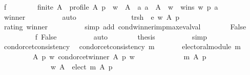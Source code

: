 \begin{isabellebody}
\ f{}{\isacharcolon}{\kern0pt}\isanewline
\ \ \ \ \ \ \ \ {\isachardoublequoteopen}finite\ A\ {\isasymand}\ profile\ A\ p\ {\isasymand}\ w\ {\isasymin}\ A\ {\isasymand}\ {\isacharparenleft}{\kern0pt}{\isasymforall}a{\isachardot}{\kern0pt}\ a\ {\isasymnotin}\ A\ {\isacharminus}{\kern0pt}\ {\isacharbraceleft}{\kern0pt}w{\isacharbraceright}{\kern0pt}\ {\isasymor}\ wins\ w\ p\ a{\isacharparenright}{\kern0pt}{\isachardoublequoteclose}\isanewline
\ \ \ \ \ \ \ \ \isamarkupfalse%
\ winner\isanewline
\ \ \ \ \ \ \ \ \isamarkupfalse%
\ auto\isanewline
\ \ \ \ \ \ \isamarkupfalse%
\isanewline
\ \ \ \ \ \ \ \ {\isachardoublequoteopen}{\isacharquery}{\kern0pt}trsh\ {\isacharequal}{\kern0pt}\ e\ w\ A\ p{\isachardoublequoteclose}\isanewline
\ \ \ \ \ \ \ \ \isamarkupfalse%
\ rating\ winner\isanewline
\ \ \ \ \ \ \ \ \isamarkupfalse%
\ {\isacharparenleft}{\kern0pt}simp\ add{\isacharcolon}{\kern0pt}\ cond{\isacharunderscore}{\kern0pt}winner{\isacharunderscore}{\kern0pt}imp{\isacharunderscore}{\kern0pt}max{\isacharunderscore}{\kern0pt}eval{\isacharunderscore}{\kern0pt}val{\isacharparenright}{\kern0pt}\isanewline
\ \ \ \ \ \ \isamarkupfalse%
\ False\isanewline
\ \ \ \ \ \ \ \ \isamarkupfalse%
\ f{}\ False\isanewline
\ \ \ \ \ \ \ \ \isamarkupfalse%
\ auto\isanewline
\ \ \ \ \ \ \isamarkupfalse%
\ {\isacharquery}{\kern0pt}thesis\isanewline
\ \ \ \ \ \ \ \ \isamarkupfalse%
\ simp\isanewline
\ \ \ \ \isamarkupfalse%
\isanewline
\ \ \isamarkupfalse%
\isanewline
{}\isamarkupfalse%
%
\endisatagproof
{\isafoldproof}%
%
\isadelimproof
\isanewline
%
\endisadelimproof
\isanewline
{}\isamarkupfalse%
\ condorcet{\isacharunderscore}{\kern0pt}consistency{}{\isacharcolon}{\kern0pt}\isanewline
\ \ {\isachardoublequoteopen}condorcet{\isacharunderscore}{\kern0pt}consistency\ m\ {\isasymlongleftrightarrow}\isanewline
\ \ \ \ \ \ electoral{\isacharunderscore}{\kern0pt}module\ m\ {\isasymand}\isanewline
\ \ \ \ \ \ \ \ {\isacharparenleft}{\kern0pt}{\isasymforall}\ A\ p\ w{\isachardot}{\kern0pt}\ condorcet{\isacharunderscore}{\kern0pt}winner\ A\ p\ w\ {\isasymlongrightarrow}\isanewline
\ \ \ \ \ \ \ \ \ \ \ \ {\isacharparenleft}{\kern0pt}m\ A\ p\ {\isacharequal}{\kern0pt}\isanewline
\ \ \ \ \ \ \ \ \ \ \ \ \ \ {\isacharparenleft}{\kern0pt}{\isacharbraceleft}{\kern0pt}w{\isacharbraceright}{\kern0pt}{\isacharcomma}{\kern0pt}\ A\ {\isacharminus}{\kern0pt}\ {\isacharparenleft}{\kern0pt}elect\ m\ A\ p{\isacharparenright}{\kern0pt}{\isacharcomma}{\kern0pt}\ {\isacharbraceleft}{\kern0pt}{\isacharbraceright}{\kern0pt}{\isacharparenright}{\kern0pt}{\isacharparenright}{\kern0pt}{\isacharparenright}{\kern0pt}{\isachardoublequoteclose}\isanewline

\end{isabellebody}

